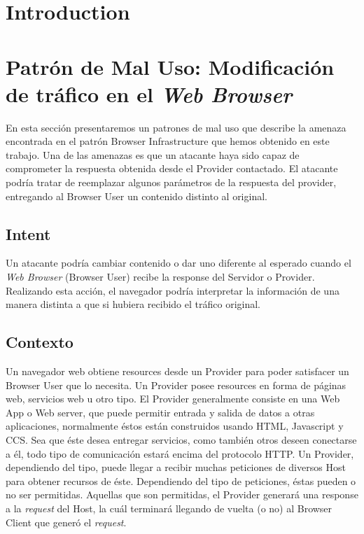 \documentclass{sig-alternate-05-2015}
\begin{document}





\section*{Introduction}


\section{Patrón de Mal Uso: Modificación de tráfico en el \textit{Web Browser}}
En esta sección presentaremos un patrones de mal uso que describe la amenaza encontrada en el patrón Browser Infrastructure que hemos obtenido en este trabajo.
Una de las amenazas es que un atacante haya sido capaz de comprometer la respuesta obtenida desde el Provider contactado. El atacante podría tratar de reemplazar algunos parámetros de la respuesta del provider, entregando al Browser User un contenido distinto al original.

\subsection{Intent}
Un atacante podría cambiar contenido o dar uno diferente al esperado cuando el \textit{Web Browser} (Browser User) recibe la response del Servidor o Provider. Realizando esta acción, el navegador podría interpretar la información de una manera distinta a que si hubiera recibido el tráfico original.

\subsection{Contexto}
Un navegador web obtiene resources desde un Provider para poder satisfacer un Browser User que lo necesita. Un Provider posee resources en forma de páginas web, servicios web u otro tipo. El Provider generalmente consiste en una Web App o Web server, que puede permitir entrada y salida de datos a otras aplicaciones, normalmente éstos están construidos usando HTML, Javascript y CCS. Sea que éste desea entregar servicios, como también otros deseen conectarse a él, todo tipo de comunicación estará encima del protocolo HTTP. Un Provider, dependiendo del tipo, puede llegar a recibir muchas peticiones de diversos Host para obtener recursos de éste. Dependiendo del tipo de peticiones, éstas pueden o no ser permitidas. Aquellas que son permitidas, el Provider generará una response a la \textit{request} del Host, la cuál terminará llegando de vuelta (o no) al Browser Client que generó el \textit{request}.
\end{document}
